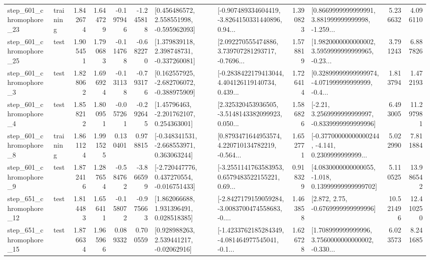 \begin{tabular}{llrrrrllrlrr}
  step\_601\_chromophore\_23 &  training &      1.842674 &    1.644729 &     -0.197946 & -1.245818 &    [0.456486572, 2.558551998, -0.595962093] &  [-0.907489334604419, -3.8264150331440896, 0.94... &       1.390823 &  [0.8669999999999991, 3.881999999999998, -1.259... &            5.236632 &          4.096110 \\
  step\_601\_chromophore\_25 &      test &      1.905451 &    1.790683 &     -0.114768 & -0.682270 &    [1.379839118, 2.398748731, -0.337260081] &  [2.092270555474886, 3.739707281293717, -0.7696... &       1.578819 &  [1.9820000000000002, 3.5959999999999965, -0.23... &            3.791243 &          6.887826 \\
   step\_601\_chromophore\_3 &      test &      1.828062 &    1.696924 &     -0.131138 & -0.793176 &   [0.162557925, -2.682706072, -0.388975909] &  [-0.2838422179413044, 4.404126119140734, 0.439... &       1.726414 &  [0.32899999999999974, -4.071999999999999, -0.4... &            1.813794 &          1.472193 \\
   step\_601\_chromophore\_4 &      test &      1.858212 &    1.800951 &     -0.057261 & -0.292645 &     [1.45796463, -2.201762107, 0.254363001] &  [2.325320453936505, -3.5148143382099923, 0.050... &       1.586826 &   [-2.21, 3.2569999999999997, -0.8339999999999996] &            6.493005 &         11.297981 \\
   step\_601\_chromophore\_8 &  training &      1.861124 &    1.991525 &      0.130401 &  0.978815 &   [-0.348341531, -2.668553971, 0.363063244] &  [0.8793471644953574, 4.220710134782219, -0.564... &       1.652771 &  [-0.37700000000000244, -4.141, 0.2309999999999... &            5.022990 &          7.811884 \\
   step\_601\_chromophore\_9 &      test &      1.872416 &    1.287654 &     -0.584762 & -3.866599 &   [-2.720447776, 0.437270554, -0.016751433] &  [-3.2551141763583953, 0.6579483522155221, 0.69... &       0.918329 &  [4.0830000000000055, -1.018, 0.13999999999999702] &            5.110525 &         13.986542 \\
  step\_651\_chromophore\_12 &      test &      1.814483 &    1.656411 &     -0.158072 & -0.975663 &     [1.862066688, 1.931396491, 0.028518385] &  [-2.8427179159059284, -3.0083700474558683, -0.... &       1.463858 &                 [2.872, 2.75, -0.6769999999999996] &           10.521496 &         12.410250 \\
  step\_651\_chromophore\_15 &      test &      1.876634 &    1.965966 &      0.089332 &  0.700559 &     [0.928988263, 2.539441217, -0.02062916] &  [-1.4233762185284349, -4.081464977545041, -0.1... &       1.626728 &  [1.708999999999996, 3.7560000000000002, -0.330... &            6.023573 &          8.241685 \\

\end{tabular}
